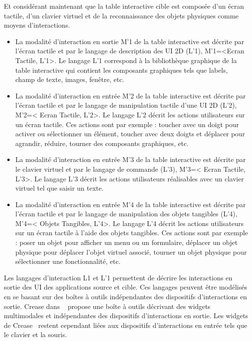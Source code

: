 Et considérant maintenant que la table interactive cible est composée d'un écran tactile, d'un clavier virtuel et de la reconnaissance des objets physiques comme moyens d'interactions.
\begin{itemize}
\item La modalité d'interaction en sortie M'1  de la table interactive est décrite par l'écran tactile et par le langage de description des UI 2D (L'1), M'1=<Ecran Tactile, L'1>. Le langage L'1 correspond à la bibliothèque graphique de la table interactive qui contient les composants graphiques tels que labels, champ de texte, images, fenêtre, etc.
\item La modalité d'interaction en entrée M'2  de la table interactive est décrite par l'écran tactile et par le langage de manipulation tactile d'une UI 2D (L'2), M'2=< Ecran Tactile, L'2>. Le langage L'2 décrit les actions utilisateurs sur un écran tactile. Ces actions sont par exemple : toucher avec un doigt pour activer ou sélectionner un élément, toucher avec deux doigts et déplacer pour agrandir, réduire, tourner des composants graphiques, etc.
\item La modalité d'interaction en entrée M'3  de la table interactive est décrite par le clavier virtuel  et par le langage de commande  (L'3), M'3=< Ecran Tactile, L'3>. Le langage L'3 décrit les actions utilisateurs réalisables avec un clavier virtuel tel que saisir un texte.
\item La modalité d'interaction en entrée M'4  de la table interactive est décrite par l'écran tactile et par le langage de manipulation des objets tangibles (L'4), M'4=< Objets Tangibles, L'4>. Le langage L'4 décrit les actions utilisateurs sur un écran tactile à l'aide des objets tangibles. Ces actions sont par exemple : poser un objet pour afficher un menu ou un formulaire, déplacer un objet physique pour déplacer l'objet virtuel associé, tourner un objet physique pour sélectionner une fonctionnalité, etc.
\end{itemize}

Les langages d'interaction L1 et L'1 permettent de décrire les interactions en sortie des UI des applications source et cible. Ces langages peuvent être modélisés en se basant sur des boîtes à outils indépendantes des dispositifs d'interactions en sortie. Crease dans ~\cite{December2001} propose une boîte à outils décrivant des widgets multimodales et indépendantes des dispositifs d'interactions en sortie. Les widgets de Crease~\cite{December2001} restent cependant liées aux dispositifs d'interactions en entrée tels que le clavier et la souris.

